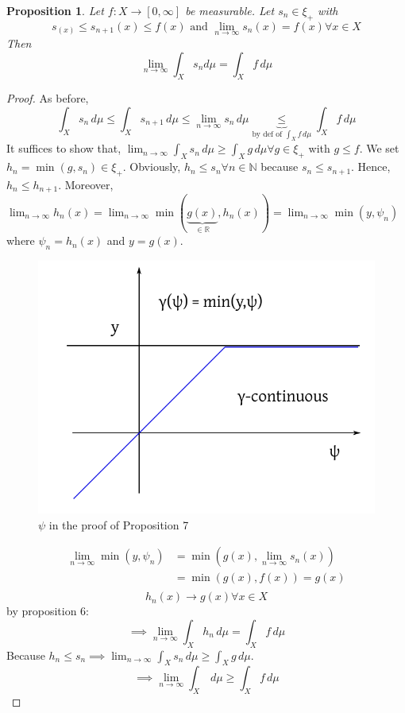 \documentclass{article}
\newtheorem{proposition}{Proposition}  \numberwithin{proposition}{section}
\begin{document}
\begin{proposition}  %
  Let $f: X \to [0,\infty]$ be measurable. Let $s_n \in \xi_+$ with
  \[ s_(x) \leq s_{n+1}(x) \leq f(x) \text{ and } \lim_{n\to\infty} s_n(x) = f(x) \forall x \in X \]
  Then
  \[ \lim_{n\to\infty} \int_X s_n d\mu = \int_X f \, d\mu \]
\end{proposition}
\begin{proof}
  As before,
  \[ \int_X s_n \, d\mu \leq \int_X s_{n+1} \, d\mu \leq \lim_{n\to\infty} s_n \, d\mu \underbrace{\leq}_{\text{by def of $\int_X f \, d\mu$}} \int_X f \, d\mu \]
  It suffices to show that, $\lim_{n\to\infty} \int_X s_n \, d\mu \geq \int_X g \, d\mu \forall g \in \xi_+$ with $g \leq f$.
  We set $h_n = \min(g, s_n) \in \xi_+$. Obviously, $h_n \leq s_n \forall n \in \mathbb N$ because $s_n \leq s_{n+1}$.
  Hence, $h_n \leq h_{n+1}$. Moreover, $\lim_{n \to \infty} h_n(x) = \lim_{n\to\infty} \min\left(\underbrace{g(x)}_{\in \mathbb R}, h_n(x)\right) = \lim_{n\to\infty} \min(y, \psi_n)$ where $\psi_n = h_n(x)$ and $y = g(x)$.
  \begin{figure}[!ht]
    \begin{center}
      \includegraphics{img/17_psi.pdf}
      \caption{$\psi$ in the proof of Proposition 7}
    \end{center}
  \end{figure}
  \begin{align*}
    \lim_{n\to\infty} \min(y, \psi_n)
      &= \min(g(x), \lim_{n\to\infty} s_n(x)) \\
      &= \min(g(x), f(x)) = g(x) \\
  \end{align*}
  \[ h_n(x) \to g(x) \forall x \in X \]
  by proposition 6:
  \[ \implies \lim_{n\to\infty} \int_X h_n \, d\mu = \int_X f \, d\mu \]
  Because $h_n \leq s_n \implies \lim_{n\to\infty} \int_X s_n \, d\mu \geq \int_X g \, d\mu$.
  \[ \implies \lim_{n\to\infty} \int_X \, d\mu \geq \int_X f \, d\mu \]
\end{proof}
\end{document}
